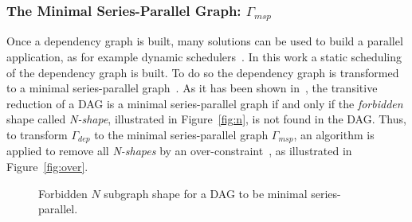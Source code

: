 \subsubsection*{The Minimal Series-Parallel Graph: $\Gamma_{msp}$}
Once a dependency graph is built, many solutions can be used to build a parallel application, as for example dynamic schedulers~\cite{Augonnet2011,Gautier:2013:XRS:2510661.2511383}. In this work a static scheduling of the dependency graph is built. To do so the dependency graph is transformed to a minimal series-parallel graph~\cite{Valdes:1979:RSP:800135.804393}. As it has been shown in~\cite{Valdes:1979:RSP:800135.804393}, the transitive reduction of a DAG is a minimal series-parallel graph if and only if the \emph{forbidden} shape called \emph{N-shape}, illustrated in Figure~\ref{fig:n}, is not found in the DAG. Thus, to transform $\Gamma_{dep}$ to the minimal series-parallel graph $\Gamma_{msp}$, an algorithm is applied to remove all \emph{N-shapes} by an over-constraint~\cite{Mitchell:2004:CMV:1082101.1082117}, as illustrated in Figure~\ref{fig:over}.

\begin{figure}[h!]
\begin{center}
  \hspace{25pt}
  \caption{Forbidden $N$ subgraph shape for a DAG to be minimal series-parallel.}
  \label{fig:forbidden}
\end{center}
\end{figure}


